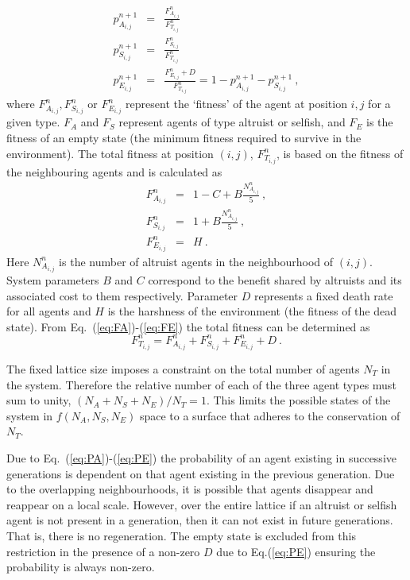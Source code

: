 \documentclass[11pt]{article}
\begin{document}
\begin{eqnarray}
p_{A_{i,j}}^{n+1} & = & \frac{F_{A_{i,j}}^n}{F_{T_{i,j}}^n} \label{eq:PA}\\
p_{S_{i,j}}^{n+1} & = & \frac{F_{S_{i,j}}^n}{F_{T_{i,j}}^n} \label{eq:PS}\\
p_{E_{i,j}}^{n+1} & = & \frac{F_{E_{i,j}}^n+D}{F_{T_{i,j}}^n} = 1-p_{A_{i,j}}^{n+1} - p_{S_{i,j}}^{n+1}~, \label{eq:PE}
\end{eqnarray}
where $F_{A_{i,j}}^n, F_{S_{i,j}}^n$ or $F_{E_{i,j}}^n$ represent the `fitness' of the agent at position $i,j$ for a given type. $F_A$ and $F_S$ represent agents of type altruist or selfish, and $F_E$ is the fitness of an empty state (the minimum fitness required to survive in the environment). The total fitness at position $(i,j)$, $F_{T_{i,j}}^n$, is based on the fitness of the neighbouring agents and is calculated as
\begin{eqnarray}
F_{A_{i,j}}^n & = & 1 - C + B\frac{N_{A_{i,j}}^n}{5}~, \label{eq:FA} \\
F_{S_{i,j}}^n & = & 1 + B\frac{N_{A_{i,j}}^n}{5} ~,\label{eq:FS} \\
F_{E_{i,j}}^n & = & H~. \label{eq:FE}
\end{eqnarray}
Here $N_{A_{i,j}}^n$ is the number of altruist agents in the neighbourhood of $(i,j)$. System parameters $B$ and $C$ correspond to the benefit shared by altruists and its associated cost to them respectively. Parameter $D$ represents a fixed death rate for all agents and $H$ is the harshness of the environment (the fitness of the dead state).
From Eq.~(\ref{eq:FA})-(\ref{eq:FE}) the total fitness can be determined as 
\begin{equation}
F_{T_{i,j}}^n = F_{A_{i,j}}^n + F_{S_{i,j}}^n + F_{E_{i,j}}^n + D~. 
\end{equation}

The fixed lattice size imposes a constraint on the total number of agents $N_T$ in the system. Therefore the relative number of each of the three agent types must sum to unity, $(N_A+N_S+N_E)/N_T=1$. This limits the possible states of the system in $f(N_A,N_S,N_E)$ space to a surface that adheres to the conservation of $N_T$. 

Due to Eq.~(\ref{eq:PA})-(\ref{eq:PE}) the probability of an agent existing in successive generations is dependent on that agent existing in the previous generation. Due to the overlapping neighbourhoods, it is possible that agents disappear and reappear on a local scale. 
However, over the entire lattice if an altruist or selfish agent is not present in a generation, then it can not exist in future generations. That is, there is no regeneration. The empty state is excluded from this restriction in the presence of a non-zero $D$ due to Eq.(\ref{eq:PE}) ensuring the probability is always non-zero.
\end{document}
